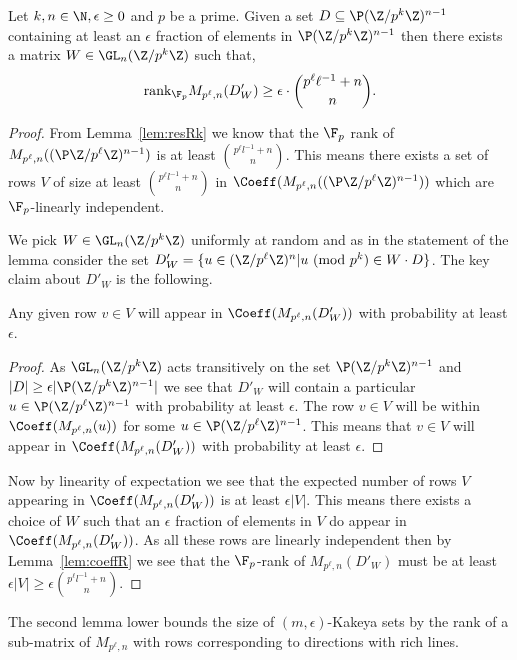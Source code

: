 \begin{lem}\label{fm:rdRo}
Let $k,n\in \N,\epsilon \ge 0$ and $p$ be a prime. Given a set $D\subseteq \P (\Z/p^k\Z)^{n-1}$  containing at least an $\epsilon$ fraction of elements in $\P (\Z/p^k\Z)^{n-1}$ then there exists a matrix {\em $W\in \GL_n(\Z/p^k\Z)$} such that,
{\em $$\text{rank}_{\F_p} M_{p^\ell,n}(D'_W)\ge \epsilon \cdot \binom{p^\ell \ell^{-1}+n}{n}.$$}
\end{lem}
\begin{proof}
From Lemma~\ref{lem:resRk} we know that the $\F_p$ rank of $M_{p^\ell,n}((\P \Z/p^\ell\Z)^{n-1})$ is at least $\binom{p^\ell l^{-1}+n}{n}$. This means there exists a set of rows $V$ of size at least $\binom{p^\ell l^{-1}+n}{n}$ in $\Coeff(M_{p^\ell,n}((\P \Z/p^\ell\Z)^{n-1}))$ which are $\F_p$-linearly independent.

We pick $W\in \GL_n(\Z/p^k\Z)$ uniformly at random and as in the statement of the lemma consider the set $D'_W=\{u\in (\Z/p^\ell\Z)^{n}| u\text{ (mod }p^k\text{)}\in W\cdot D\}$. The key claim about $D'_W$ is the following.

\begin{claim}
Any given row $v\in V$ will appear in {\em$\Coeff(M_{p^\ell,n}(D'_W))$} with probability at least $\epsilon$.  
\end{claim}
\begin{proof}
As $\GL_n(\Z/p^k\Z)$ acts transitively on the set $\P (\Z/p^k\Z)^{n-1}$ and $|D|\ge \epsilon |\P (\Z/p^k\Z)^{n-1}|$ we see that $D'_W$ will contain a particular $u\in \P (\Z/p^\ell\Z)^{n-1}$ with probability at least $\epsilon$. The row $v\in V$ will be within $\Coeff(M_{p^\ell,n}(u))$ for some $u\in \P (\Z/p^\ell\Z)^{n-1}$. This means that $v\in V$ will appear in $\Coeff(M_{p^\ell,n}(D'_W))$ with probability at least $\epsilon$. 
\end{proof}

Now by linearity of expectation we see that the expected number of rows $V$ appearing in $\Coeff(M_{p^\ell,n}(D'_W))$ is at least $\epsilon|V|$. This means there exists a choice of $W$ such that an $\epsilon$ fraction of elements in $V$ do appear in $\Coeff(M_{p^\ell,n}(D'_W))$. As all these rows are linearly independent then by Lemma~\ref{lem:coeffR} we see that the $\F_p$-rank of $M_{p^\ell,n}(D'_W)$ must be at least $\epsilon|V|\ge \epsilon \binom{p^\ell l^{-1}+n}{n}$.
\end{proof}

The second lemma lower bounds the size of $(m,\epsilon)$-Kakeya sets by the rank of a sub-matrix of $M_{p^\ell, n}$ with rows corresponding to directions with rich lines.

